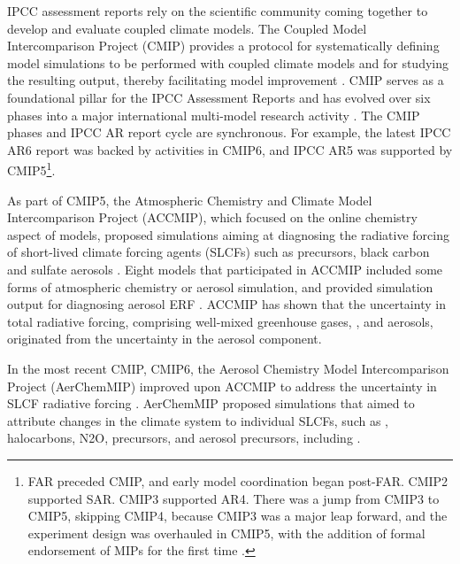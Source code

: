 IPCC assessment reports rely on the scientific community coming together to develop and evaluate coupled climate models. The Coupled Model Intercomparison Project (CMIP) provides a protocol for systematically defining model simulations to be performed with coupled climate models and for studying the resulting output, thereby facilitating model improvement \citep{eyringOverviewCoupledModel2016}. CMIP serves as a foundational pillar for the IPCC Assessment Reports and has evolved over six phases into a major international multi-model research activity \citep{taylorOverviewCMIP5Experiment2012,eyringOverviewCoupledModel2016}. The CMIP phases and IPCC AR report cycle are synchronous. For example, the latest IPCC AR6 report was backed by activities in CMIP6, and IPCC AR5 was supported by CMIP5\footnote{FAR preceded CMIP, and early model coordination began post-FAR. CMIP2 supported SAR. CMIP3 supported AR4. There was a jump from CMIP3 to CMIP5, skipping CMIP4, because CMIP3 was a major leap forward, and the experiment design was overhauled in CMIP5, with the addition of formal endorsement of MIPs for the first time \citep{taylorOverviewCMIP5Experiment2012}. }.

As part of CMIP5, the Atmospheric Chemistry and Climate Model Intercomparison Project (ACCMIP), which focused on the online chemistry aspect of models, proposed simulations aiming at diagnosing the radiative forcing of short-lived climate forcing agents (SLCFs) such as  precursors, black carbon and sulfate aerosols \citep{lamarqueAtmosphericChemistryClimate2013}. Eight models that participated in ACCMIP included some forms of atmospheric chemistry or aerosol simulation, and provided simulation output for diagnosing aerosol ERF \citep{shindellRadiativeForcingACCMIP2013}. ACCMIP has shown that the uncertainty in total radiative forcing, comprising well-mixed greenhouse gases, , and aerosols, originated from the uncertainty in the aerosol component.

In the most recent CMIP, CMIP6, the Aerosol Chemistry Model Intercomparison Project (AerChemMIP) improved upon ACCMIP to address the uncertainty in SLCF radiative forcing \citep{collinsAerChemMIPQuantifyingEffects2017,eyringOverviewCoupledModel2016}. AerChemMIP proposed simulations that aimed to attribute changes in the climate system to individual SLCFs, such as , halocarbons, N2O,  precursors, and aerosol precursors, including .

